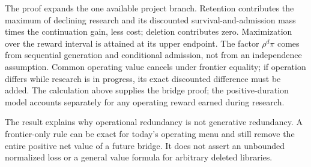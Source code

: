 The proof expands the one available project branch. Retention contributes
the maximum of declining research and its discounted survival-and-admission
mass times the continuation gain, less cost; deletion contributes zero.
Maximization over the reward
interval is attained at its upper endpoint. The factor
\(\rho^d\pi\) comes from sequential generation and conditional admission, not
from an independence assumption. Common operating value cancels under
frontier equality; if operation differs while research is in progress, its
exact discounted difference must be added. The calculation above supplies the bridge proof; the positive-duration model accounts separately for any operating reward earned during research.

The result explains why operational redundancy is not generative redundancy.
A frontier-only rule can be exact for today's operating menu and still remove
the entire positive net value of a future bridge. It does not assert an
unbounded normalized loss or a general value formula for arbitrary deleted
libraries.
